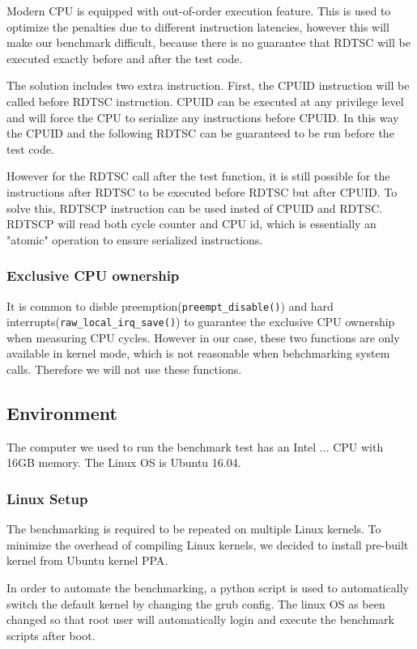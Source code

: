 \documentclass{article}
\begin{document}
Modern CPU is equipped with out-of-order execution feature.
This is used to optimize the penalties due to different instruction latencies,
however this will make our benchmark difficult, because there is no guarantee that
RDTSC will be executed exactly before and after the test code.

The solution includes two extra instruction. First, the CPUID instruction will be called before RDTSC
instruction. CPUID can be executed at any privilege level and will force the CPU to serialize any instructions
before CPUID. In this way the CPUID and the following RDTSC can be guaranteed to be run before the test code.

However for the RDTSC call after the test function,
it is still possible for the instructions after RDTSC to be executed before RDTSC but after CPUID.
To solve this, RDTSCP instruction can be used insted of CPUID and RDTSC.
RDTSCP will read both cycle counter and CPU id, which is essentially an "atomic" operation
to ensure serialized instructions.

\subsubsection{Exclusive CPU ownership}

It is common to disble preemption(\lstinline{preempt_disable()}) and hard interrupts(\lstinline{raw_local_irq_save()})
to guarantee the exclusive CPU ownership when measuring CPU cycles. However in our case, these two functions
are only available in kernel mode, which is not reasonable when behchmarking system calls.
Therefore we will not use these functions.

\subsection{Environment}

The computer we used to run the benchmark test has an Intel ... CPU with 16GB memory. The Linux OS is Ubuntu 16.04.

\subsubsection{Linux Setup}

The benchmarking is required to be repeated on multiple Linux kernels.
To minimize the overhead of compiling Linux kernels,
we decided to install pre-built kernel from Ubuntu kernel PPA\cite{kernelppa}. 

In order to automate the benchmarking, a python script is used to automatically switch the default kernel by changing the grub config.
The linux OS as been changed so that root user will automatically login and execute the benchmark scripts after boot.
\end{document}
